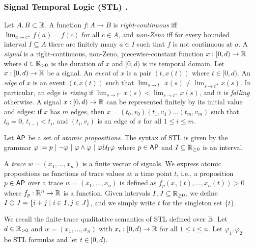 \subsubsection{Signal Temporal Logic (STL) \cite{MalerN13}.}
Let $A,B \subset \mathbb{R}$.
%
A function $f : A \to B$ is
\emph{right-continuous} iff $\lim_{a \to c^+} f(a) = f(c)$ for all $c \in A$, and
\emph{non-Zeno} iff for every bounded interval $I \subseteq A$ there are finitely many $a \in I$ such that $f$ is not continuous at $a$.
%
A \emph{signal} is a right-continuous, non-Zeno, piecewise-constant function $x : [0,d) \to \mathbb{R}$ where $d \in \mathbb{R}_{> 0}$ is the duration of $x$ and $[0,d)$ is its temporal domain.
Let $x : [0,d) \to \mathbb{R}$ be a signal.
An \emph{event} of $x$ is a pair $(t, x(t))$ where $t \in [0,d)$.
An \emph{edge} of $x$ is an event $(t, x(t))$ such that $\lim_{s \to t^-} x(s) \neq \lim_{s \to t^+} x(s)$.
In particular, an edge is \emph{rising} if $\lim_{s \to t^-} x(s) < \lim_{s \to t^+} x(s)$, and it is \emph{falling} otherwise.
A signal $x : [0,d) \to \mathbb{R}$ can be represented finitely by its initial value and edges: if $x$ has $m$ edges, then $x = (t_0, v_0) (t_1, v_1) \ldots (t_m, v_m)$ such that $t_0 = 0$, $t_{i-1} < t_i$, and $(t_i, v_i)$ is an edge of $x$ for all $1 \leq i \leq m$.

Let $\mathsf{AP}$ be a set of \emph{atomic propositions}.
The syntax of STL is given by the grammar $\varphi :=  p ~|~ \lnot \varphi ~|~ \varphi \land \varphi ~|~ \varphi \kern.1em\mathcal{U}_I \varphi$ where $p \in \mathsf{AP}$ and $I \subseteq \mathbb{R}_{\geq 0}$ is an interval.

A \emph{trace} $w = (x_1, \ldots, x_n)$ is a finite vector of signals.
We express atomic propositions as functions of trace values at a time point $t$,
i.e., a proposition $p \in \mathsf{AP}$ over a trace $w = (x_1, \ldots, x_n)$ is defined as $f_p(x_1(t), \ldots, x_n(t)) > 0$ where $f_p : \mathbb{R}^n \to \mathbb{R}$ is a function.
Given intervals $I,J \subseteq \mathbb{R}_{\geq 0}$, we define $I \oplus J = \{i + j \st i \in I , j \in J\}$, and we simply write $t$ for the singleton set $\{t\}$. 

We recall the finite-trace qualitative semantics of STL defined over $\mathbb{B}$.
Let $d \in \mathbb{R}_{> 0}$ and $w = (x_1, \ldots, x_n)$ with $x_i : [0,d) \to \mathbb{R}$ for all $1 \leq i \leq n$.
Let $\varphi_1, \varphi_2$ be STL formulas and let $t \in [0,d)$.

